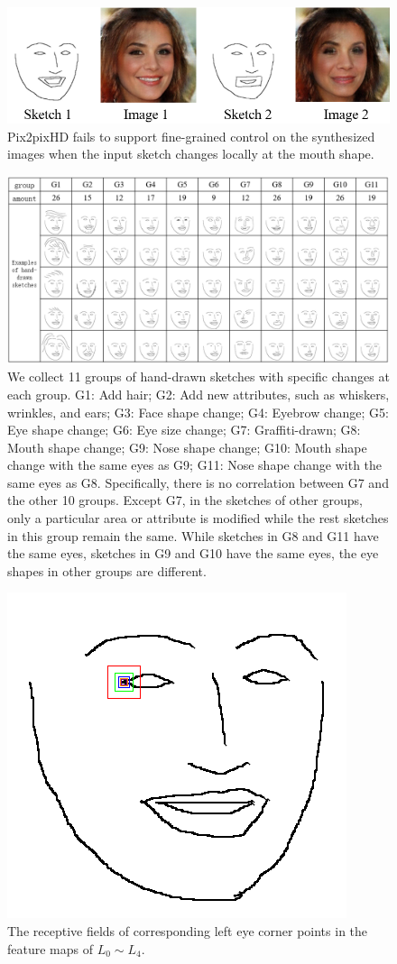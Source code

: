 \documentclass[10pt,twocolumn,letterpaper]{article}
\begin{document}
\begin{figure}
	\centering
	\includegraphics[width=\columnwidth]{figures/prob-in-pix2pixHD.png}
	\caption{Pix2pixHD fails to support fine-grained control on the synthesized images when the input sketch changes locally at the mouth shape.}
	\label{fig:problem-in}
\end{figure}


\begin{figure}[htbp]
	\centering
	\includegraphics[width=\textwidth]{hand_drawn_sketches.png}
	\caption{We collect 11 groups of hand-drawn sketches with specific changes at each group. G1: Add hair; G2: Add new attributes, such as whiskers, wrinkles, and ears; G3: Face shape change; G4: Eyebrow change; G5: Eye shape change; G6: Eye size change; G7: Graffiti-drawn; G8: Mouth shape change; G9: Nose shape change; G10: Mouth shape change with the same eyes as G9; G11: Nose shape change with the same eyes as G8. Specifically, there is no correlation between G7 and the other 10 groups. Except G7, in the sketches of other groups, only a particular area or attribute is modified while the rest sketches in this group remain the same. While sketches in G8 and G11 have the same eyes, sketches in G9 and G10 have the same eyes, the eye shapes in other groups are different.}
	\label{fig:hand_drawn_contours}
\end{figure}

\begin{figure}[htbp]
	\begin{center}
		\includegraphics[width=0.2 \textwidth]{receptive_field.png}
	\end{center}
	\caption{The receptive fields of corresponding left eye corner points in the feature maps of $L_0\sim L_4$. }
	\label{fig:receptive}
\end{figure}
\end{document}

